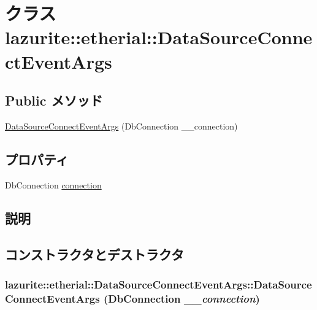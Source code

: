 \hypertarget{classlazurite_1_1etherial_1_1_data_source_connect_event_args}{
\section{クラス lazurite::etherial::DataSourceConnectEventArgs}
\label{classlazurite_1_1etherial_1_1_data_source_connect_event_args}
}
\subsection*{Public メソッド}
\begin{DoxyCompactItemize}
\item 
\hyperlink{classlazurite_1_1etherial_1_1_data_source_connect_event_args_adcf4169ff9d198136bf639a9a04a83ac}{DataSourceConnectEventArgs} (DbConnection \_\-\_\-connection)
\end{DoxyCompactItemize}
\subsection*{プロパティ}
\begin{DoxyCompactItemize}
\item 
DbConnection \hyperlink{classlazurite_1_1etherial_1_1_data_source_connect_event_args_a8ec9c97736251b574749fa524d8c1cd7}{connection}
\end{DoxyCompactItemize}


\subsection{説明}


\subsection{コンストラクタとデストラクタ}
\hypertarget{classlazurite_1_1etherial_1_1_data_source_connect_event_args_adcf4169ff9d198136bf639a9a04a83ac}{
\subsubsection[{DataSourceConnectEventArgs}]{\setlength{\rightskip}{0pt plus 5cm}lazurite::etherial::DataSourceConnectEventArgs::DataSourceConnectEventArgs (DbConnection {\em \_\-\_\-connection})}}
\label{classlazurite_1_1etherial_1_1_data_source_connect_event_args_adcf4169ff9d198136bf639a9a04a83ac}


